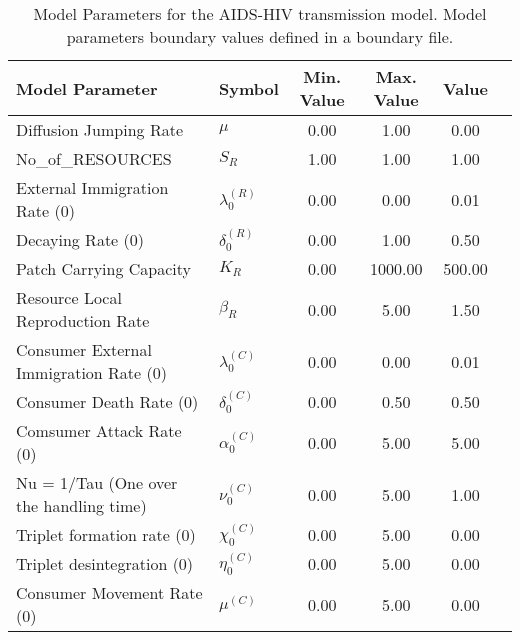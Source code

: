 \begin{table}
\centering
\begin{tabular}{p{5cm}lcccc}
{\bf Model Parameter} & {\bf Symbol} & {\bf Min. Value} & {\bf Max. Value} & {\bf Value}\\
\hline\hline
Diffusion Jumping Rate & $\mu$ & 0.00 & 1.00 & 0.00\\
No_of_RESOURCES & $S_R$ & 1.00 & 1.00 & 1.00\\
External Immigration Rate (0) & $\lambda^{(R)}_0$ & 0.00 & 0.00 & 0.01\\
Decaying Rate (0) & $\delta^{(R)}_0$ & 0.00 & 1.00 & 0.50\\
Patch Carrying Capacity & $K_R$ & 0.00 & 1000.00 & 500.00\\
Resource Local Reproduction Rate & $\beta_R$ & 0.00 & 5.00 & 1.50\\
Consumer External Immigration Rate (0) & $\lambda^{(C)}_0$ & 0.00 & 0.00 & 0.01\\
Consumer Death Rate (0) & $\delta^{(C)}_0$ & 0.00 & 0.50 & 0.50\\
Comsumer Attack Rate (0) & $\alpha^{(C)}_0$ & 0.00 & 5.00 & 5.00\\
Nu = 1/Tau (One over the handling time) & $\nu^{(C)}_0$ & 0.00 & 5.00 & 1.00\\
Triplet formation rate (0) & $\chi^{(C)}_0$ & 0.00 & 5.00 & 0.00\\
Triplet desintegration (0) & $\eta^{(C)}_0$ & 0.00 & 5.00 & 0.00\\
Consumer Movement Rate (0) & $\mu^{(C)}$ & 0.00 & 5.00 & 0.00\\
\hline\hline
\end{tabular}
\caption{Model Parameters for the AIDS-HIV transmission model. Model parameters boundary values defined in a boundary file.}
\end{table}
